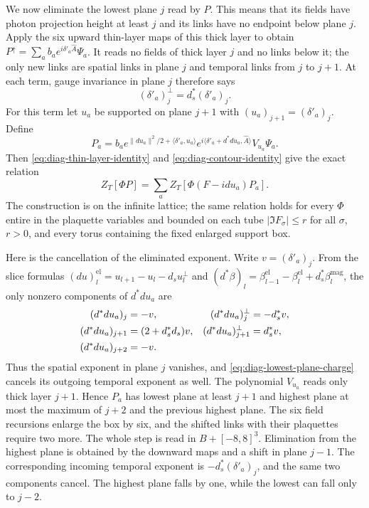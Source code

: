 We now eliminate the lowest plane $j$ read by $P$. This means
that its fields have photon projection height at least $j$
and its links have no endpoint below plane $j$. Apply the
six upward thin-layer maps of this thick layer to obtain
$P^\uparrow=\sum_a b_a e^{i\delta'_a\widehat A}\Psi_a$.
It reads no fields of thick layer $j$ and no links below it;
the only new links are spatial links in plane $j$ and temporal
links from $j$ to $j+1$. At each term, gauge invariance in
plane $j$ therefore says
\begin{equation}\label{eq:diag-lowest-plane-charge}
 (\delta'_a)^\perp_j=d_s^*(\delta'_a)_j.
\end{equation}
For this term let $u_a$ be supported on plane $j+1$ with
$(u_a)_{j+1}=(\delta'_a)_j$. Define
\begin{equation}\label{eq:diag-outer-polynomial}
 P_a=b_a e^{\|du_a\|^2/2+\langle\delta'_a,u_a\rangle}
       e^{i\langle\delta'_a+d^*du_a,\widehat A\rangle}
                                    V_{u_a}\Psi_a.
\end{equation}
Then \eqref{eq:diag-thin-layer-identity} and
\eqref{eq:diag-contour-identity} give the exact relation
\begin{equation}\label{eq:diag-outer-identity}
 Z_T[\Phi P]=\sum_a Z_T[\Phi(F-idu_a)P_a].
\end{equation}
The construction is on the infinite lattice; the same relation
holds for every $\Phi$ entire in the plaquette variables and
bounded on each tube $|\Im F_\sigma|\le r$ for all $\sigma$,
$r>0$, and every torus containing the fixed enlarged support box.

Here is the cancellation of the eliminated exponent. Write
$v=(\delta'_a)_j$. From the slice formulas
$(du)^{\mathrm{el}}_l=u_{l+1}-u_l-d_su_l^\perp$ and
$(d^*\beta)_l=\beta^{\mathrm{el}}_{l-1}
-\beta^{\mathrm{el}}_l+d_s^*\beta^{\mathrm{mag}}_l$, the only
nonzero components of $d^*du_a$ are
\begin{align}\label{eq:diag-outer-cancellation}
 (d^*du_a)_j&=-v,&(d^*du_a)^\perp_j&=-d_s^*v,\notag\\
 (d^*du_a)_{j+1}&=(2+d_s^*d_s)v,
       &(d^*du_a)^\perp_{j+1}&=d_s^*v,\notag\\
 (d^*du_a)_{j+2}&=-v.
\end{align}
Thus the spatial exponent in plane $j$ vanishes, and
\eqref{eq:diag-lowest-plane-charge} cancels its outgoing
temporal exponent as well. The polynomial $V_{u_a}$ reads
only thick layer $j+1$. Hence $P_a$ has lowest plane at
least $j+1$ and highest plane at most the maximum of $j+2$
and the previous highest plane. The six field recursions
enlarge the box by six, and the shifted links with their
plaquettes require two more. The whole step is read in
$B+[-8,8]^3$. Elimination from the highest plane is obtained
by the downward maps and a shift in plane $j-1$. The corresponding
incoming temporal exponent is
$-d_s^*(\delta'_a)_j$, and the same two components cancel.
The highest plane falls by one, while the lowest can fall
only to $j-2$.

